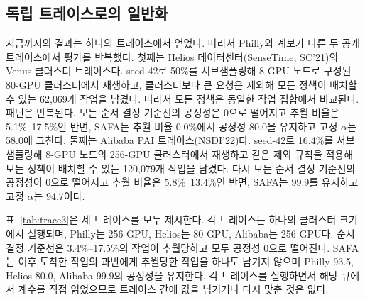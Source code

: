 \documentclass{ieeetj}
\begin{document}
\subsection{독립 트레이스로의 일반화}\label{eval:robust:trace}
지금까지의 결과는 하나의 트레이스에서 얻었다. 따라서 Philly와 계보가 다른 두 공개 트레이스에서 평가를 반복했다. 첫째는 Helios\cite{hu2021helios} 데이터센터(SenseTime, SC'21)의 Venus 클러스터 트레이스다. seed-42로 50\%를 서브샘플링해 8-GPU 노드로 구성된 80-GPU 클러스터에서 재생하고, 클러스터보다 큰 요청은 제외해 모든 정책이 배치할 수 있는 62{,}069개 작업을 남겼다. 따라서 모든 정책은 동일한 작업 집합에서 비교된다. 패턴은 반복된다. 모든 순서 결정 기준선의 공정성은 0으로 떨어지고 추월 비율은 5.1\%~17.5\%인 반면, SAFA는 추월 비율 0.0\%에서 공정성 80.0을 유지하고 고정 $\alpha$는 58.0에 그친다. 둘째는 Alibaba PAI\cite{weng2022mlaas} 트레이스(NSDI'22)다. seed-42로 16.4\%를 서브샘플링해 8-GPU 노드의 256-GPU 클러스터에서 재생하고 같은 제외 규칙을 적용해 모든 정책이 배치할 수 있는 120{,}079개 작업을 남겼다. 다시 모든 순서 결정 기준선의 공정성이 0으로 떨어지고 추월 비율은 5.8\%~13.4\%인 반면, SAFA는 99.9를 유지하고 고정 $\alpha$는 94.7이다.

표~\ref{tab:trace3}은 세 트레이스를 모두 제시한다. 각 트레이스는 하나의 클러스터 크기에서 실행되며, Philly는 256 GPU, Helios는 80 GPU, Alibaba는 256 GPU다. 순서 결정 기준선은 3.4\%--17.5\%의 작업이 추월당하고 모두 공정성 0으로 떨어진다. SAFA는 이후 도착한 작업의 과반에게 추월당한 작업을 하나도 남기지 않으며 Philly 93.5, Helios 80.0, Alibaba 99.9의 공정성을 유지한다. 각 트레이스를 실행하면서 해당 큐에서 계수를 직접 읽었으므로 트레이스 간에 값을 넘기거나 다시 맞춘 것은 없다.
\end{document}
